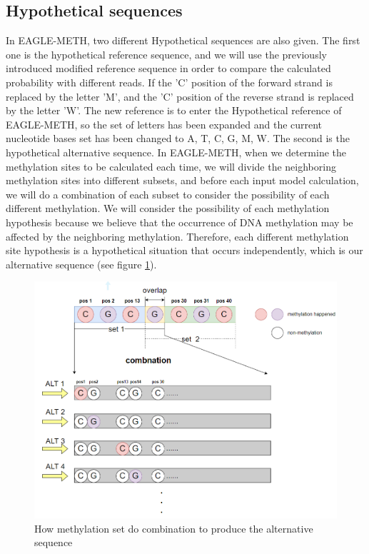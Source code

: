 \documentclass{PHlab-thesis}
\begin{document}
\subsection{Hypothetical sequences}
In EAGLE-METH, two different Hypothetical sequences are also given.
The first one is the hypothetical reference sequence, and we will use the previously introduced modified reference sequence in order to compare the calculated probability with different reads. If the 'C' position of the forward strand is replaced by the letter 'M', and the 'C' position of the reverse strand is replaced by the letter 'W'. The new reference is to enter the Hypothetical reference of EAGLE-METH, so the set of letters has been expanded and the current nucleotide bases set has been changed to A, T, C, G, M, W. The second is the hypothetical alternative sequence. In EAGLE-METH, when we determine the methylation sites to be calculated each time, we will divide the neighboring methylation sites into different subsets, and before each input model calculation, we will do a combination of each subset to consider the possibility of each different methylation. We will consider the possibility of each methylation hypothesis because we believe that the occurrence of DNA methylation may be affected by the neighboring methylation. Therefore, each different methylation site hypothesis is a hypothetical situation that occurs independently, which is our alternative sequence (see figure \ref{fig:meth_set}).

\begin{figure}[h]
  \centering
  \includegraphics[scale=0.8]{figures/meth_set.PNG}
  \caption{How methylation set do combination to produce the alternative sequence}
  \label{fig:meth_set}
\end{figure}
\vfill
\vfill
\end{document}
